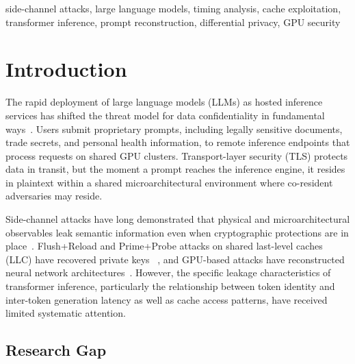\documentclass[journal,10pt,twocolumn]{IEEEtran}
\begin{document}
\begin{IEEEkeywords}
side-channel attacks, large language models, timing analysis,
cache exploitation, transformer inference, prompt reconstruction,
differential privacy, GPU security
\end{IEEEkeywords}

\section{Introduction}
\label{sec:intro}

The rapid deployment of large language models (LLMs) as hosted
inference services has shifted the threat model for data
confidentiality in fundamental ways~\cite{yi2024survey,
duan2024llmsec}. Users submit proprietary prompts, including
legally sensitive documents, trade secrets, and personal health
information, to remote inference endpoints that process requests
on shared GPU clusters. Transport-layer security (TLS) protects
data in transit, but the moment a prompt reaches the inference
engine, it resides in plaintext within a shared microarchitectural
environment where co-resident adversaries may reside.

Side-channel attacks have long demonstrated that physical and
microarchitectural observables leak semantic information even
when cryptographic protections are in place~\cite{kocher1996timing,
brumley2003remote}. Flush+Reload and Prime+Probe attacks on
shared last-level caches (LLC) have recovered private keys
~\cite{yarom2014flush,liu2015last,gruss2016flushflush}, and
GPU-based attacks have reconstructed neural network
architectures~\cite{ramesh2024profiling,yan2020cache}.
However, the specific leakage characteristics of transformer
inference, particularly the relationship between token identity
and inter-token generation latency as well as cache access
patterns, have received limited systematic attention.

\subsection*{Research Gap}
\end{document}
